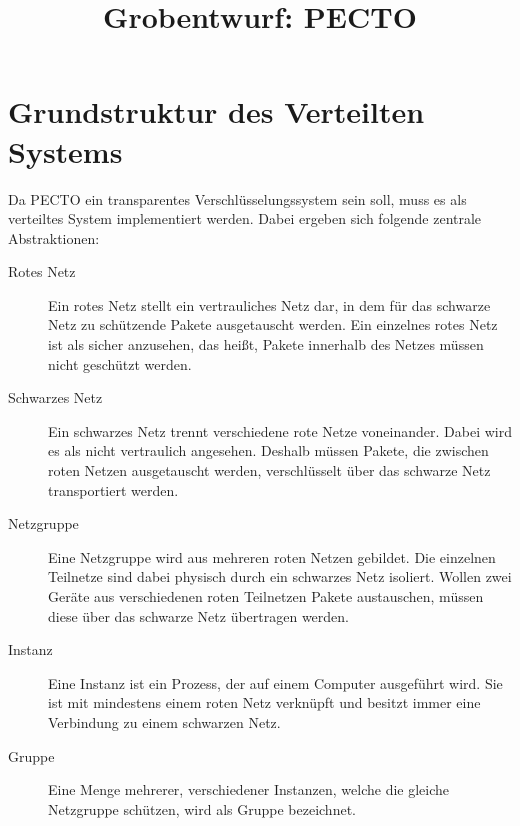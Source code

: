 \documentclass[a4paper, 11pt, ngerman, fleqn]{article}
\begin{document}
	
\title{Grobentwurf: PECTO}
\vspace{3 in}
\maketitle
\clearpage

\tableofcontents

\clearpage
\section{Grundstruktur des Verteilten Systems}

Da PECTO ein transparentes Verschlüsselungssystem sein soll, muss es als verteiltes System implementiert werden.
Dabei ergeben sich folgende zentrale Abstraktionen:

\begin{description}
	\item[Rotes Netz] 
	Ein rotes Netz stellt ein vertrauliches Netz dar, in dem für das schwarze Netz zu schützende Pakete ausgetauscht werden. Ein einzelnes rotes Netz ist als sicher anzusehen, das heißt, Pakete innerhalb des Netzes müssen nicht geschützt werden.
	
	\item[Schwarzes Netz] 
	Ein schwarzes Netz trennt verschiedene rote Netze voneinander. 
	Dabei wird es als nicht vertraulich angesehen. 
	Deshalb müssen Pakete, die zwischen roten Netzen ausgetauscht werden, verschlüsselt über das schwarze Netz transportiert werden.
	
	\item[Netzgruppe]
	Eine Netzgruppe wird aus mehreren roten Netzen gebildet. 
	Die einzelnen Teilnetze sind dabei physisch durch ein schwarzes Netz isoliert. 
	Wollen zwei Geräte aus verschiedenen roten Teilnetzen Pakete austauschen, müssen diese über das schwarze Netz übertragen werden.
	
	\item[Instanz] Eine Instanz ist ein Prozess, der auf einem Computer ausgeführt wird. 
	Sie ist mit mindestens einem roten Netz verknüpft und besitzt immer eine Verbindung zu einem schwarzen Netz.
	
	\item[Gruppe] Eine Menge mehrerer, verschiedener Instanzen, welche die gleiche Netzgruppe schützen, wird als Gruppe bezeichnet.

\end{description}

\clearpage
\end{document}
